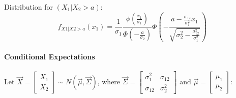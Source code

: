 \documentclass[a4paper]{article}
\numberwithin{equation}{subsection}
\begin{document}
Distribution for $(X_{1}|X_{2} > a)$:
\begin{equation}
  f_{X1|X2 > a}(x_{1}) = 
  \frac{1}{\sigma_{1}}
  \frac{\phi \left( \frac{x_{1}}{\sigma_{1}} \right)}
  {\Phi \left( -\frac{a}{\sigma_{2}} \right)}
  \Phi \left(
    - \frac{a - \frac{\sigma_{12}}{\sigma_{1}^{2}} x_{1}}
    {\sqrt{\sigma_{2}^{2} - \frac{\sigma_{12}^{2}}{\sigma_{1}^{2}}}}
  \right)
\end{equation}

\paragraph{Conditional Expectations}
Let
\begin{math}
  \vec{X}=
  \begin{bmatrix}
    X_1\\
    X_2
  \end{bmatrix}
  \sim
  N(\vec{\mu}, \vec{\Sigma})
\end{math}, where
\begin{math}
\vec{\Sigma} = \left[
 \begin{array}{rr} \sigma_1^2 & \sigma_{12}\\ \sigma_{12} & \sigma_2^2
 \end{array}\right]
\end{math} and
\begin{math}
\vec{\mu}=\left[\begin{array}{r} \mu_1\\
 \mu_2\end{array}\right]
\end{math}:
\end{document}
